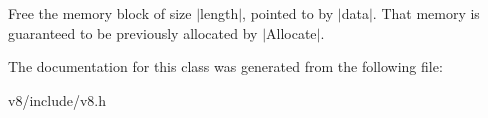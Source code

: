 Free the memory block of size $|$length$|$, pointed to by $|$data$|$. That memory is guaranteed to be previously allocated by $|$\-Allocate$|$. 

The documentation for this class was generated from the following file\-:\begin{DoxyCompactItemize}
\item 
v8/include/v8.\-h\end{DoxyCompactItemize}
